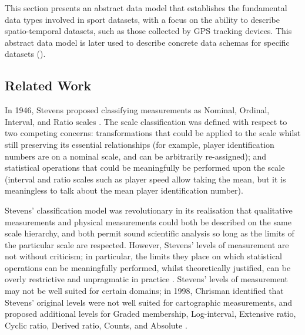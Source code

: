 

This section presents an abstract data model that establishes the fundamental data
types involved in sport datasets, with a focus on the ability to describe
spatio-temporal datasets, such as those collected by GPS tracking devices.
This abstract data model is later used to describe concrete data schemas
for specific datasets ().

\subsection{Related Work}\label{related-work}

In 1946, Stevens proposed classifying measurements as Nominal, Ordinal,
Interval, and Ratio scales \cite{stevens1946scales}. The scale
classification was defined with respect to two competing concerns: transformations
that could be applied to the scale whilst still preserving its essential
relationships (for example, player identification numbers are on a
nominal scale, and can be arbitrarily re-assigned); and statistical
operations that could be meaningfully be performed upon the scale
(interval and ratio scales such as player speed allow taking the
mean, but it is meaningless to talk about the mean player identification
number).

Stevens' classification model was revolutionary in its realisation that
qualitative measurements and physical measurements could both be
described on the same scale hierarchy, and both permit sound scientific
analysis so long as the limits of the particular scale are respected.
However, Stevens' levels of measurement are not without criticism; in
particular, the limits they place on which statistical operations can
be meaningfully performed, whilst theoretically justified, can be overly
restrictive and unpragmatic in practice \cite{lord1953statistical}.
Stevens' levels of measurement may not be well suited for certain
domains; in 1998, Chrisman identified that Stevens' original levels were
not well suited for cartographic measurements, and proposed additional
levels for Graded membership, Log-interval, Extensive ratio, Cyclic
ratio, Derived ratio, Counts, and Absolute
\cite{chrisman1998rethinking}.

